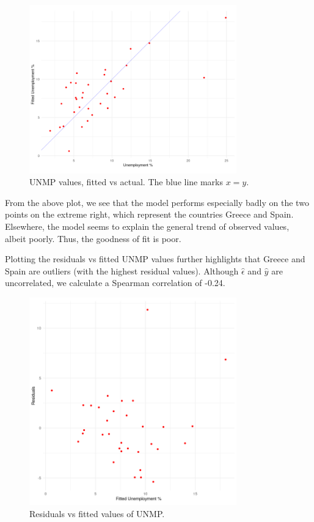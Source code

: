 \documentclass[10pt]{article}
\begin{document}
    \begin{figure}[H]
    \begin{center}
        \includegraphics[width=0.8\textwidth]{scatter.png}
    \end{center}
    \caption{UNMP values, fitted vs actual. The blue line marks $x = y$.}
    \label{fig:scatter}
    \end{figure}

    From the above plot, we see that the model performs especially badly on the two
    points on the extreme right, which represent the countries Greece and Spain.
    Elsewhere, the model seems to explain the general trend of observed values,
    albeit poorly. Thus, the goodness of fit is poor.

    Plotting the residuals vs fitted UNMP values further highlights that Greece and
    Spain are outliers (with the highest residual values). Although $\hat{\epsilon}$
    and $\hat{y}$ are uncorrelated, we calculate a Spearman correlation of -0.24.

    \begin{figure}[H]
    \begin{center}
        \includegraphics[width=0.8\textwidth]{residuals.png}
    \end{center}
    \caption{Residuals vs fitted values of UNMP.}
    \label{fig:residuals}
    \end{figure}
\end{document}
